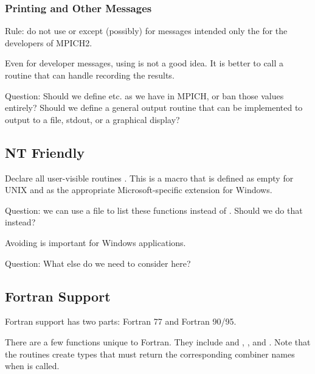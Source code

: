 \documentclass{article}
\begin{document}
\subsubsection{Printing and Other Messages}
Rule: do not use  or  except (possibly) for
messages intended only the for the developers of MPICH2.

Even for developer messages, using  is not a good idea.
It is better to call a routine that can handle recording the results.


Question: Should we define  etc. as we have in MPICH, or
ban those values entirely?  Should we define a general output routine
that can be implemented to output to a file, stdout, or a graphical display?

\subsection{NT Friendly}

Declare all user-visible routines .
This is a 
macro that is defined as empty for UNIX and as the appropriate
Microsoft-specific extension for Windows.

Question: we can use a file to list these functions instead of
.  Should we do that instead?

Avoiding  is important for Windows applications.

Question: What else do we need to consider here?

\subsection{Fortran Support}
Fortran support has two parts: Fortran 77 and Fortran 90/95.  

There are a few functions unique to Fortran.  They include
 and , 
, and 
.  Note that the 
routines create types that must return the corresponding combiner names when
 is called.
\end{document}
